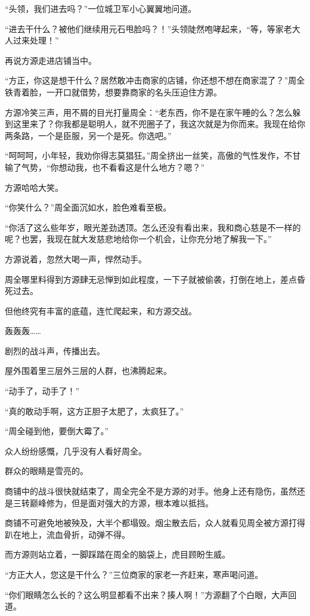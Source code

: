 \begin{this_body}
“头领，我们进去吗？”一位城卫军小心翼翼地问道。

“进去干什么？被他们继续用元石甩脸吗？！”头领陡然咆哮起来，“等，等家老大人过来处理！”

再说方源走进店铺当中。

“方正，你这是想干什么？居然敢冲击商家的店铺，你还想不想在商家混了？”周全铁青着脸，一开口就借势，想要靠商家的名头压迫住方源。

方源冷笑三声，用不屑的目光打量周全：“老东西，你不是在家午睡的么？怎么躲到这里来了？你我都是聪明人，就不兜圈子了，我这次就是为你而来。我现在给你两条路，一个是臣服，另一个是死。你选吧。”

“呵呵呵，小年轻，我劝你得志莫猖狂。”周全挤出一丝笑，高傲的气性发作，不甘输了气势，“你想动我，也不看看这是什么地方？嗯？”

方源哈哈大笑。

“你笑什么？”周全面沉如水，脸色难看至极。

“你活了这么些年岁，眼光差劲透顶。怎么还没有看出来，我和商心慈是不一样的呢？也罢，我现在就大发慈悲地给你一个机会，让你充分地了解我一下。”

方源说着，忽然大喝一声，悍然动手。

周全哪里料得到方源肆无忌惮到如此程度，一下子就被偷袭，打倒在地上，差点昏死过去。

但他终究有丰富的底蕴，连忙爬起来，和方源交战。

轰轰轰……

剧烈的战斗声，传播出去。

屋外围着里三层外三层的人群，也沸腾起来。

“动手了，动手了！”

“真的敢动手啊，这方正胆子太肥了，太疯狂了。”

“周全碰到他，要倒大霉了。”

众人纷纷感慨，几乎没有人看好周全。

群众的眼睛是雪亮的。

商铺中的战斗很快就结束了，周全完全不是方源的对手。他身上还有隐伤，虽然还是三转巅峰修为，但是面对强大的方源，根本难以抵挡。

商铺不可避免地被殃及，大半个都塌毁。烟尘散去后，众人就看见周全被方源打得趴在地上，流血骨折，动弹不得。

而方源则站立着，一脚踩踏在周全的脑袋上，虎目顾盼生威。

“方正大人，您这是干什么？”三位商家的家老一齐赶来，寒声喝问道。

“你们眼睛怎么长的？这么明显都看不出来？揍人啊！”方源翻了个白眼，大声回道。


\end{this_body}
